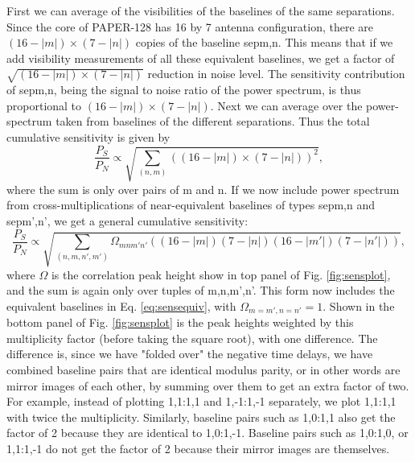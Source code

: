 \documentclass[preprint2,numberedappendix,tighten,twocolappendix]{aastex6}  %
\renewcommand\[{\begin{equation}}
\renewcommand\]{\end{equation}}
\begin{document}
First we can average of the visibilities of the baselines of the same
separations. Since the core of PAPER-128 has 16 by 7 antenna configuration, there
are $(16-|m|)\times(7-|n|)$ copies of the baseline sepm,n. This means
that if we add visibility measurements of all these equivalent baselines,
we get a factor of $\sqrt{(16-|m|)\times(7-|n|)}$ reduction in noise
level. The sensitivity contribution of sepm,n, being the signal to
noise ratio of the power spectrum, is thus proportional to $(16-|m|)\times(7-|n|)$.
Next we can average over the power-spectrum taken from baselines of
the different separations. Thus the total cumulative sensitivity is
given by 
\begin{equation}
\frac{P_{S}}{P_{N}}\propto\sqrt{\sum_{(n,m)}\left((16-|m|)\times(7-|n|)\right)^{2}},\label{eq:sensequiv}
\end{equation}
where the sum is only over pairs of m and n. If we now include power
spectrum from cross-multiplications of near-equivalent baselines of
types sepm,n and sepm',n', we get a general cumulative sensitivity:
\small
\begin{equation}
\frac{P_{S}}{P_{N}}\propto\sqrt{\sum_{(n,m,n',m')}\Omega_{mnm'n'}\left((16-|m|)(7-|n|)(16-|m'|)(7-|n'|)\right)},\label{eq:sensul}
\end{equation}
\normalsize
where $\Omega$ is the correlation peak height show in top panel of Fig. \eqref{fig:sensplot},
and the sum is again only over tuples of m,n,m',n'. This form now
includes the equivalent baselines in Eq. \eqref{eq:sensequiv}, with
$\Omega_{m=m',n=n'}=1$. 
Shown in the bottom panel of Fig. \eqref{fig:sensplot} is the peak heights weighted
by this multiplicity factor (before taking the square root), with one difference. The difference is, 
since we have "folded over" the negative time delays, we have combined baseline pairs that are identical modulus parity, 
or in other words are mirror images of each other, by summing over them to get an extra factor of two. For example, 
instead of plotting 1,1:1,1 and 1,-1:1,-1 separately, we plot 1,1:1,1 with twice the multiplicity. Similarly, baseline pairs such as 
1,0:1,1 also get the factor of 2 because they are identical to 1,0:1,-1. Baseline pairs such as 1,0:1,0, or 1,1:1,-1 do not get
the factor of 2 because their mirror images are themselves. 

\end{document}
